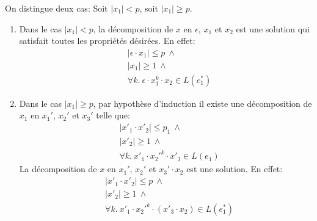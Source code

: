 \documentclass[12pt,french,a4paper]{article}
\begin{document}
\begin{question}
\begin{enumerate}
On distingue deux cas: Soit $|x_1| < p$, soit $|x_1| \geq p$.
\begin{enumerate}
\item
Dans le cas $|x_1| < p$, la décomposition de $x$ en $\epsilon$, $x_1$ et $x_2$ est une solution qui satisfait toutes les propriétés désirées. En effet:
\begin{align*}
&|\epsilon \cdot x_1| \leq p\ \wedge\\
&|x_1| \geq 1\ \wedge\\
&\forall k.\ \epsilon \cdot x_1^k \cdot x_2 \in L(e_1^*)
\end{align*}
\item
Dans le cas $|x_1| \geq p$, par hypothèse d'induction il existe une décomposition de $x_1$ en $x_1'$, $x_2'$ et $x_3'$ telle que:
\begin{align*}
&|x'_1 \cdot x'_2| \leq p_1\ \wedge\\
&|x'_2| \geq 1\ \wedge\\
&\forall k.\ x'_1 \cdot x_2'^k \cdot x'_3 \in L(e_1)
\end{align*}
La décomposition de $x$ en $x_1'$, $x_2'$ et $x_3' \cdot x_2$ est une solution. En effet:
\begin{align*}
&|x'_1 \cdot x'_2| \leq p\ \wedge\\
&|x'_2| \geq 1\ \wedge\\
&\forall k.\ x'_1 \cdot x_2'^k \cdot (x'_3 \cdot x_2) \in L(e_1^*)
\end{align*}

\end{enumerate}
\end{enumerate}

\end{question}
\end{document}
